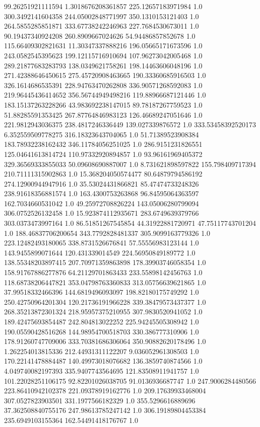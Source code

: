 99.26251921111594	1.3018676208361857	225.12657183971984	1.0
300.3492141604358	244.05002848771997	350.1310153121403	1.0
264.5855285851871	333.67738242246963	227.7684530673011	1.0
90.19437340924208	260.8909667024626	54.94486857852678	1.0
115.66409302821631	11.30347337888216	196.05665171673596	1.0
243.0582545395623	199.12115716910694	107.96273042005468	1.0
289.21877683283793	138.0349621758261	198.14463606048196	1.0
271.42388646450615	275.45720908463665	190.33360685916503	1.0
326.1614686535391	228.94763470262808	336.90571268592083	1.0
219.96445436414652	356.56744949498216	119.88966687121446	1.0
183.15137263228266	43.983692238147015	89.78187267759523	1.0
51.88285591353425	267.87764846983123	126.46689247051646	1.0
221.9812943036375	238.4817246336449	139.027339876572	1.0
333.53458392520173	6.352559509778275	316.18323643704065	1.0
51.71389523908384	183.78932238162432	346.11784056251025	1.0
286.9151231826551	125.04641613814724	110.97332920894857	1.0
93.96161969405372	329.36569333855033	50.09608690887007	1.0
8.731621898597822	155.798409717394	210.71111315902863	1.0
15.368204050574477	80.64879794586192	274.12900944947916	1.0
35.53024431866821	85.47474733248326	238.91618356881574	1.0
163.4300753263868	96.84595064363597	162.7034660531042	1.0
49.25972708826224	143.05006280799094	306.0752526132458	1.0
15.923874112935671	283.6749639379766	303.0373473997164	1.0
86.51851267545854	44.31922881720971	47.75117743701204	1.0
188.46837706200654	343.7792828481337	305.9099163779326	1.0
223.12482493180065	338.8731526676841	57.55556983123144	1.0
143.9455899071644	120.431339014549	224.56950849189772	1.0
138.55348203897415	207.70971359863898	178.39903746058354	1.0
158.91767886277876	64.21129701863433	233.55898142456763	1.0
118.68738206447821	353.04798763360833	313.05756639621865	1.0
37.99518332466396	144.6819496093097	198.82180175749292	1.0
250.42750964201304	120.21736191966228	339.38479573437377	1.0
268.35213872301324	218.95957375210955	307.9830520941052	1.0
189.42475693854487	242.804813022252	225.94245505308942	1.0
190.05590428516268	144.98954700518703	330.386777310906	1.0
178.91260747709006	333.70381686306064	350.90882620178496	1.0
1.262254013815336	212.44931311122207	9.036052961308503	1.0
170.22141478884487	140.49973018076682	136.3859740874566	1.0
4.049740082197393	335.9407743564695	121.83508911941757	1.0
101.22028251106175	92.82201026038705	91.0136936687747	1.0
247.9006284480566	223.86410942102378	221.09378919162776	1.0
209.17639933468004	307.0527823903501	331.1977566182329	1.0
355.5296616889696	37.362508840755176	247.98613785247142	1.0
306.19189804453384	235.6949103155364	162.54491418176767	1.0
